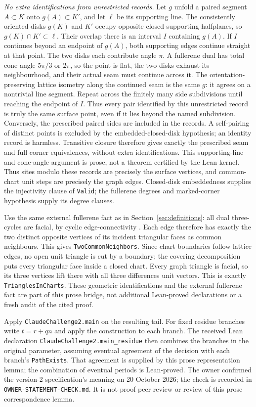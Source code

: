 \documentclass[11pt]{amsart}
\newcommand{\record}[1]{\nolinkurl{#1}}
\theoremstyle{definition}\newtheorem{definition}{Definition}
\begin{document}
\emph{No extra identifications from unrestricted records.}
Let $g$ unfold a paired segment $A\subset K$ onto $g(A)\subset K'$,
and let $\ell$ be its supporting line. The consistently oriented disks
$g(K)$ and $K'$ occupy opposite closed supporting halfplanes, so
$g(K)\cap K'\subset\ell$. Their overlap there is an interval $I$
containing $g(A)$. If $I$ continues beyond an endpoint of $g(A)$,
both supporting edges continue straight at that point. The two disks
each contribute angle $\pi$. A fullerene dual has total cone angle
$5\pi/3$ or $2\pi$, so the point is flat, the two disks exhaust its
neighbourhood, and their actual seam must continue across it. The
orientation-preserving lattice isometry along the continued seam is
the same $g$: it agrees on a nontrivial line segment. Repeat across
the finitely many side subdivisions until reaching the endpoint of
$I$. Thus every pair identified by this unrestricted record is truly
the same surface point, even if it lies beyond the named subdivision.
Conversely, the prescribed paired sides are included in the records.
A self-pairing of distinct points is excluded by the embedded-closed-disk
hypothesis; an identity record is harmless. Transitive closure therefore
gives exactly the prescribed seam and full corner equivalences, without
extra identifications. This supporting-line and cone-angle argument is
prose, not a theorem certified by the Lean kernel. Thus sites
modulo these records are precisely the surface vertices, and common-chart
unit steps are precisely the graph edges. Closed-disk embeddedness
supplies the injectivity clause of \record{Valid}; the fullerene degrees
and marked-corner hypothesis supply its degree clauses.

Use the same external fullerene fact as in Section~\ref{sec:definitions}:
all dual three-cycles are facial, by cyclic edge-connectivity
\cite{Connectivity}. Each edge therefore has exactly the two distinct
opposite vertices of its incident triangular faces as common neighbours.
This gives \record{TwoCommonNeighbors}. Since chart boundaries follow
lattice edges, no open unit triangle is cut by a boundary; the covering
decomposition puts every triangular face inside a closed chart.
Every graph triangle is facial, so its three vertices lift there with
all three differences unit vectors. This is exactly
\record{TrianglesInCharts}. These geometric identifications and the
external fullerene fact are part of this prose bridge, not additional
Lean-proved declarations or a fresh audit of the cited proof.

Apply \record{ClaudeChallenge2.main} on the resulting tail. For fixed
residue branches write $t=r+qn$ and apply the construction to each
branch. The received Lean declaration \record{ClaudeChallenge2.main_residue}
then combines the branches in the original parameter, assuming eventual
agreement of the decision with each branch's \record{PathExists}.
That agreement is supplied by this prose representation lemma;
the combination of eventual periods is Lean-proved.
The owner confirmed the version-2 specification's meaning on
20 October 2026; the check is recorded in \record{OWNER-STATEMENT-CHECK.md}.
It is not proof peer review or review of this prose correspondence lemma.
\end{document}
